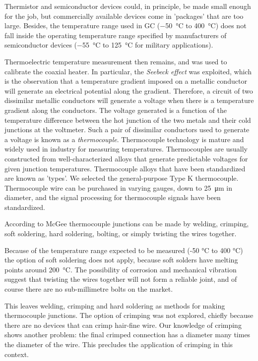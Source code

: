 Thermistor and semiconductor devices could, in principle, be made small enough
for the job, but commercially available devices come in 'packages' that are too
large. Besides, the temperature range used in GC (\SI{-50}{\celsius} to
\SI{400}{\celsius}) does not fall inside the operating temperature range
specified by manufacturers of semiconductor devices (\SI{-55}{\celsius} to
\SI{125}{\celsius} for military applications).

Thermoelectric temperature measurement then remains, and was used to calibrate
the coaxial heater. In particular, the \textit{Seebeck effect} was exploited,
which is the observation that a temperature gradient imposed on a metallic
conductor will generate an electrical potential along the gradient. Therefore, a
circuit of two dissimilar metallic conductors will generate a voltage when there
is a temperature gradient along the conductors. The voltage generated is a
function of the temperature difference between the hot junction of the two
metals and their cold junctions at the voltmeter. Such a pair of dissimilar
conductors used to generate a voltage is known as a \textit{thermocouple}.
Thermocouple technology is mature and widely used in industry for measuring
temperatures. Thermocouples are usually constructed from well-characterized
alloys that generate predictable voltages for given junction temperatures.
Thermocouple alloys that have been standardized are known as 'types'. We
selected the general-purpose Type K thermocouple.
Thermocouple wire can be purchased in varying gauges, down to
\SI{25}{\micro\metre} in diameter, and the signal processing for thermocouple
signals have been standardized.

According to McGee \autocite{McGee1988} thermocouple junctions can be made by
welding, crimping, soft soldering, hard soldering, bolting, or simply twisting
the wires together.

Because of the temperature range expected to be measured ({-}50 \si{\celsius} to
400 \si{\celsius}) the option of soft soldering does not apply, because soft
solders have melting points around \SI{200}{\celsius}. The possibility of
corrosion and mechanical vibration suggest that twisting the wires together
will not form a reliable joint, and of course there are no sub-millimetre bolts
on the market.

This leaves welding, crimping and hard soldering as methods for making
thermocouple junctions. The option of crimping was not explored, chiefly because
there are no devices that can crimp hair-fine wire. Our knowledge of crimping
shows another problem: the final crimped connection has a diameter many times
the diameter of the wire. This precludes the application of crimping in this
context.

